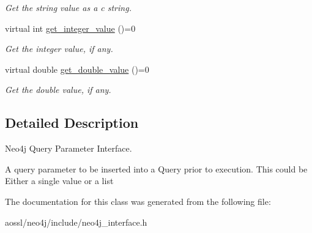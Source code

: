 \begin{DoxyCompactItemize}
\begin{DoxyCompactList}\small\item\em Get the string value as a c string. \end{DoxyCompactList}\item 
virtual int \hyperlink{classNeo4jQueryParameterInterface_a99884c5061608b8dd91c7aa82f6cffe4}{get\+\_\+integer\+\_\+value} ()=0\hypertarget{classNeo4jQueryParameterInterface_a99884c5061608b8dd91c7aa82f6cffe4}{}\label{classNeo4jQueryParameterInterface_a99884c5061608b8dd91c7aa82f6cffe4}

\begin{DoxyCompactList}\small\item\em Get the integer value, if any. \end{DoxyCompactList}\item 
virtual double \hyperlink{classNeo4jQueryParameterInterface_a7c7e3103562b514772ba1541bc71fe00}{get\+\_\+double\+\_\+value} ()=0\hypertarget{classNeo4jQueryParameterInterface_a7c7e3103562b514772ba1541bc71fe00}{}\label{classNeo4jQueryParameterInterface_a7c7e3103562b514772ba1541bc71fe00}

\begin{DoxyCompactList}\small\item\em Get the double value, if any. \end{DoxyCompactList}\end{DoxyCompactItemize}


\subsection{Detailed Description}
Neo4j Query Parameter Interface. 

A query parameter to be inserted into a Query prior to execution. This could be Either a single value or a list 

The documentation for this class was generated from the following file\+:\begin{DoxyCompactItemize}
\item 
aossl/neo4j/include/neo4j\+\_\+interface.\+h\end{DoxyCompactItemize}
